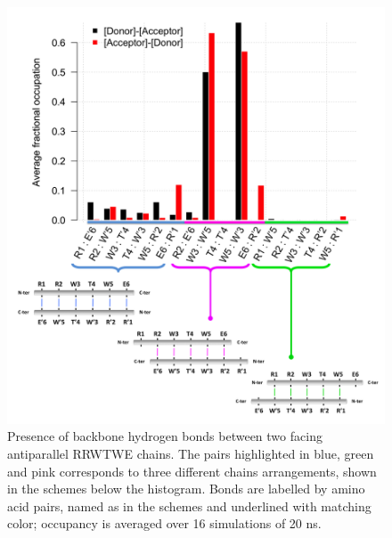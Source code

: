 \begin{figure}
\centering
\includegraphics[width=0.9\linewidth]{3results_capsule/pics/merged_figures_beta_sheet2}
\caption[Hydrogen bonds in a RRWTWE $\beta$-sheet]{Presence of backbone hydrogen bonds between two facing antiparallel RRWTWE chains. The pairs highlighted in blue, green and pink corresponds to three different chains arrangements, shown in the schemes below the histogram. Bonds are labelled by amino acid pairs, named as in the schemes and underlined with matching color; occupancy is averaged over 16 simulations of 20 ns.}
\label{fig:hb_beta_SIhere_hb}
\end{figure}

